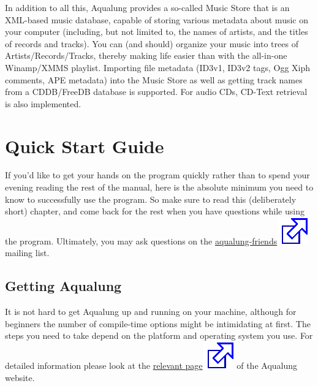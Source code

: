 \documentclass[10pt,english]{article}
\begin{document}
In addition to all this, Aqualung provides a so-called Music
Store that is an XML-based music database, capable of storing
various metadata about music on your computer (including, but
not limited to, the names of artists, and the titles of records
and tracks). You can (and should) organize your music into trees
of Artists/Records/Tracks, thereby making life easier than with
the all-in-one Winamp/XMMS playlist. Importing file metadata
(ID3v1, ID3v2 tags, Ogg Xiph comments, APE metadata) into the
Music Store as well as getting track names from a CDDB/FreeDB
database is supported. For audio CDs, CD-Text retrieval is also
implemented.




\section{Quick Start Guide\label{idp320880}}



\noindent If you'd like to get your hands on the program quickly rather
than to spend your evening reading the rest of the manual, here
is the absolute minimum you need to know to successfully use the
program. So make sure to read this (deliberately short) chapter,
and come back for the rest when you have questions while using
the program. Ultimately, you may ask questions on the
\href{https://lists.sourceforge.net/lists/listinfo/aqualung-friends}{
aqualung-friends\includegraphics[scale=0.5]{external.eps}} mailing list.


\subsection{Getting Aqualung\label{idp322992}}



\noindent It is not hard to get Aqualung up and running on your
machine, although for beginners the number of compile-time
options might be intimidating at first. The steps you need to
take depend on the platform and operating system you use. For
detailed information please look at the \href{http://aqualung.factorial.hu/compiling.html}{relevant
page\includegraphics[scale=0.5]{external.eps}} of the Aqualung website.
\end{document}

